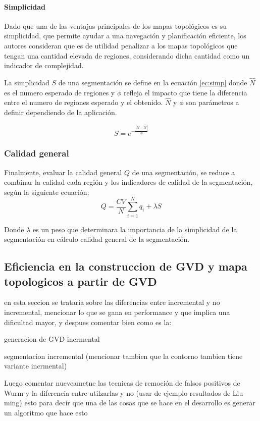 \paragraph{Simplicidad}
Dado que una de las ventajas principales de los mapas topológicos es su simplicidad, que permite ayudar a una navegación y planificación eficiente, los autores consideran que es de utilidad penalizar a los mapas topológicos que tengan una cantidad elevada de regiones, considerando dicha cantidad como un indicador de complejidad. 

La simplicidad $S$ de una segmentación se define en la ecuación \ref{ec:simp} donde $\hat{N}$ es el numero esperado de regiones y $\phi$ refleja el impacto que tiene la diferencia entre el numero de regiones esperado y el obtenido. $\hat{N}$ y $\phi$ son parámetros a definir dependiendo de la aplicación.

\begin{equation}
  S=e^{-\frac{|N-\hat{N}|}{\phi}} \label{ec:simp}
\end{equation}


\subsubsection{Calidad general}
Finalmente, evaluar la calidad general $Q$ de una segmentación, se reduce a combinar la calidad cada región y los indicadores de calidad de la segmentación, según la siguiente ecuación:
\begin{equation}
Q=\frac{CV}{N}\sum^N_{i=1}{q_i+\lambda S}
\end{equation}

Donde $\lambda$ es un peso que determinara la importancia de la simplicidad de la segmentación en cálculo calidad general de la segmentación.

\subsection{Eficiencia en la construccion de GVD y mapa topologicos a partir de GVD}
en esta seccion se trataria sobre las diferencias entre incremental y no incremental, mencionar lo que se gana en performance y que implica una dificultad mayor, y despues comentar bien como es la:

generacion de GVD incrmental

segmentacion incremental (mencionar tambien que la contorno tambien tiene variante incrmental)

Luego comentar nueveametne las tecnicas de remoción de falsos positivos de Wurm y la diferencia entre utilzarlas y no (usar de ejemplo resultados de Liu ming) esto para decir que una de las cosas que se hace en el desarrollo es generar un algoritmo que hace esto


